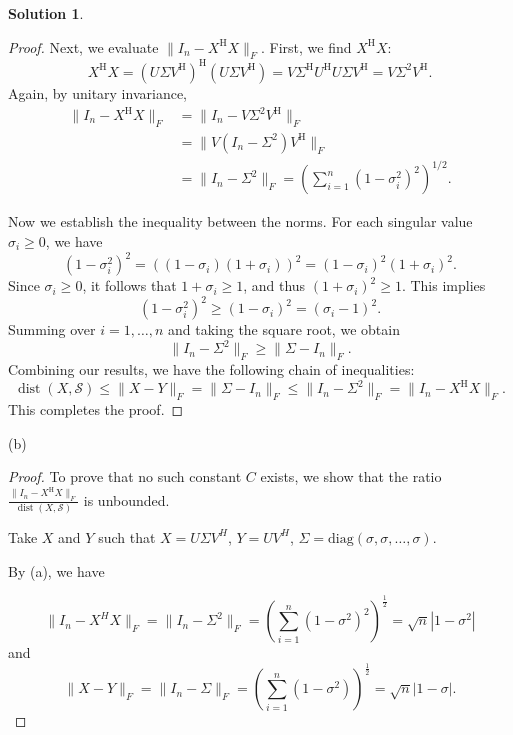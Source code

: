 \documentclass[12pt]{article}
\theoremstyle{definition}
\newtheorem*{solution}{\normalfont\textbf{Solution}}
\DeclareMathOperator{\dist}{dist}
\begin{document}
\begin{enumerate}[leftmargin=*]
\begin{solution}
\begin{proof}
            Next, we evaluate \( \| I_{n} - X^{\mathrm{H}}X \|_F \). First, we find \( X^{\mathrm{H}}X \):
            \[ X^{\mathrm{H}}X = (U \Sigma V^{\mathrm{H}})^{\mathrm{H}}(U \Sigma V^{\mathrm{H}}) = V \Sigma^{\mathrm{H}} U^{\mathrm{H}} U \Sigma V^{\mathrm{H}} = V \Sigma^2 V^{\mathrm{H}}. \]
            Again, by unitary invariance,
            \begin{align*}
                \| I_{n} - X^{\mathrm{H}}X \|_F &= \| I_{n} - V \Sigma^2 V^{\mathrm{H}} \|_F \\
                &= \| V (I_{n} - \Sigma^2) V^{\mathrm{H}} \|_F \\
                &= \| I_{n} - \Sigma^2 \|_F = \left( \sum_{i=1}^n (1 - \sigma_i^2)^2 \right)^{1/2}.
            \end{align*}

            Now we establish the inequality between the norms. For each singular value \( \sigma_i \geq 0 \), we have
            \[ (1 - \sigma_i^2)^2 = ((1 - \sigma_i)(1 + \sigma_i))^2 = (1 - \sigma_i)^2 (1 + \sigma_i)^2. \]
            Since \( \sigma_i \geq 0 \), it follows that \( 1 + \sigma_i \geq 1 \), and thus \( (1 + \sigma_i)^2 \geq 1 \). This implies
            \[ (1 - \sigma_i^2)^2 \geq (1 - \sigma_i)^2 = (\sigma_i - 1)^2. \]
            Summing over \( i=1, \dots, n \) and taking the square root, we obtain
            \[ \| I_{n} - \Sigma^2 \|_F \geq \| \Sigma - I_{n} \|_F. \]
            Combining our results, we have the following chain of inequalities:
            \[ \dist(X, \mathcal{S}) \leq \| X-Y \|_F = \| \Sigma - I_{n} \|_F \leq \| I_{n} - \Sigma^2 \|_F = \| I_{n} - X^{\mathrm{H}}X \|_F. \]
            This completes the proof.
            \end{proof}
            \item[(b)]
            \begin{proof}
                To prove that no such constant \( C \) exists, we show that the ratio \( \frac{\| I_{n} - X^{\mathrm{H}}X \|_F}{\dist(X, \mathcal{S})} \) is unbounded.

                    
                Take \( X \) and  \( Y \) such that \( X = U \Sigma V^H \), \( Y = U  V^H \), \( \Sigma = \text{diag}(\sigma, \sigma, \dots, \sigma) \).

                By (a), we have

                \[
                \|I_n - X^H X\|_F = \| I_{n} - \Sigma^2 \|_F = \left( \sum_{i=1}^n (1 - \sigma^2)^2 \right)^{\frac{1}{2}} = \sqrt{n} |1 - \sigma^2|
                \]
                and 
                \[
                \|X - Y\|_F = \|I_n - \Sigma\|_F = \left( \sum_{i=1}^n (1 - \sigma^2) \right)^{\frac{1}{2}} = \sqrt{n} |1 - \sigma|.
                \]


\end{proof}
\end{solution}
\end{enumerate}
\end{document}
